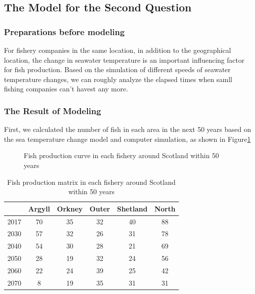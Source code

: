 \documentclass{mcmthesis}
\numberwithin{figure}{section}
\numberwithin{table}{section}
\begin{document}
\subsection{The Model for the Second Question}
\subsubsection{Preparations before modeling}
For fishery companies in the same location, in addition to the geographical location, the change in seawater temperature is an important influencing factor for fish production. Based on the simulation of different speeds of seawater temperature changes, we can roughly analyze the elapsed times when samll fishing companies can't havest any more.
\subsubsection{The Result of Modeling}
First, we calculated the number of fish in each area in the next 50 years based on the sea temperature change model and computer simulation, as shown in Figure\ref{FishProductionCurve}

\begin{figure}[tbp]
  \caption{Fish production curve in each fishery around Scotland within 50 years}\label{FishProductionCurve}
\end{figure}

\begin{table}[!htbp]
  \centering
  \begin{tabular}{|r|c|c|c|c|c|}%
  \hline  %
   & \textbf{Argyll} & \textbf{Orkney} & \textbf{Outer} & \textbf{Shetland} &\textbf{North}\\
  \hline %
  2017 & 70 &35 &32&40&88\\
  \hline %
  2030 & 57&32&26&31&78\\
  \hline %
  2040  & 54&30&28&21&69\\
  \hline %
  2050 &28&19&32&24&56\\
  \hline %
  2060 &22&24&39&25&42\\
  \hline %
  2070 &8&19&35&31&31\\
  \hline %
  \end{tabular}
  \caption{Fish production matrix in each fishery around Scotland within 50 years}
  \label{FisheryTable}
  \end{table}
\end{document}
